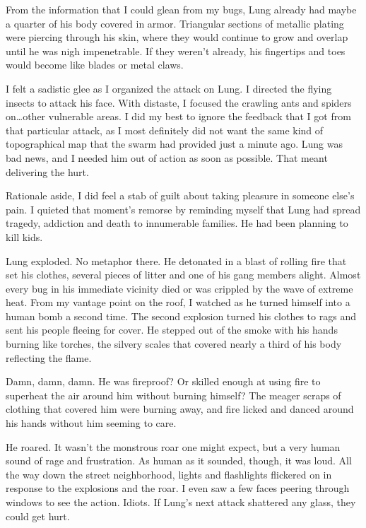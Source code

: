 From the information that I could glean from my bugs, Lung already had maybe a quarter of his body covered in armor.  Triangular sections of metallic plating were piercing through his skin, where they would continue to grow and overlap until he was nigh impenetrable.  If they weren't already, his fingertips and toes would become like blades or metal claws.



I felt a sadistic glee as I organized the attack on Lung.  I directed the flying insects to attack his face.  With distaste, I focused the crawling ants and spiders on\ldots other vulnerable areas.  I did my best to ignore the feedback that I got from that particular attack, as I most definitely did not want the same kind of topographical map that the swarm had provided just a minute ago.  Lung was bad news, and I needed him out of action as soon as possible.  That meant delivering the hurt.



Rationale aside, I did feel a stab of guilt about taking pleasure in someone else's pain.  I quieted that moment's remorse by reminding myself that Lung had spread tragedy, addiction and death to innumerable families.  He had been planning to kill kids.



Lung exploded.  No metaphor there.  He detonated in a blast of rolling fire that set his clothes, several pieces of litter and one of his gang members alight.  Almost every bug in his immediate vicinity died or was crippled by the wave of extreme heat.  From my vantage point on the roof, I watched as he turned himself into a human bomb a second time.  The second explosion turned his clothes to rags and sent his people fleeing for cover.  He stepped out of the smoke with his hands burning like torches, the silvery scales that covered nearly a third of his body reflecting the flame.



Damn, damn, damn.  He was fireproof?  Or skilled enough at using fire to superheat the air around him without burning himself?  The meager scraps of clothing that covered him were burning away, and fire licked and danced around his hands without him seeming to care.



He roared.  It wasn't the monstrous roar one might expect, but a very human sound of rage and frustration.  As human as it sounded, though, it was loud.  All the way down the street neighborhood, lights and flashlights flickered on in response to the explosions and the roar.  I even saw a few faces peering through windows to see the action.  Idiots.  If Lung's next attack shattered any glass, they could get hurt.



